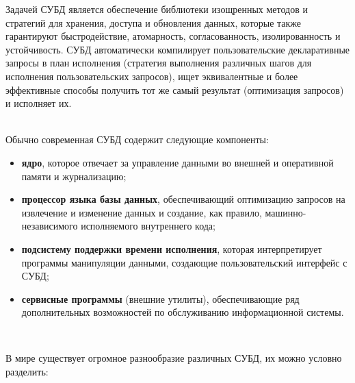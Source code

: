 Задачей СУБД является обеспечение библиотеки изощренных методов и стратегий для хранения, доступа и обновления данных, которые также гарантируют быстродействие, атомарность, согласованность, изолированность и устойчивость. СУБД автоматически компилирует пользовательские декларативные запросы в план исполнения (стратегия выполнения различных шагов для исполнения пользовательских запросов), ищет эквивалентные и более эффективные способы получить тот же самый результат (оптимизация запросов) и исполняет их. \\

\

Обычно современная СУБД содержит следующие компоненты: \\

\begin{itemize}
  \item \textbf{ядро}, которое отвечает за управление данными во внешней и оперативной памяти и журнализацию;
  \item \textbf{процессор языка базы данных}, обеспечивающий оптимизацию запросов на извлечение и изменение данных и создание, как правило, машинно-независимого исполняемого внутреннего кода;
  \item \textbf{подсистему поддержки времени исполнения}, которая интерпретирует программы манипуляции данными, создающие пользовательский интерфейс с СУБД;
  \item \textbf{сервисные программы} (внешние утилиты), обеспечивающие ряд дополнительных возможностей по обслуживанию информационной системы.
\end{itemize}
\

В мире существует огромное разнообразие различных СУБД, их можно условно разделить: \\

